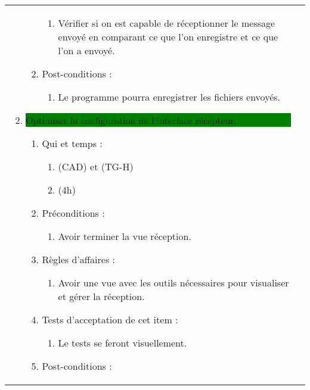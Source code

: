 \begin{longtable}{|l|p{}|}
\begin{enumerate}[label*=\arabic*.]
\begin{enumerate}[label*=\arabic*.]
\begin{enumerate}[label*=\arabic*.]
                        \item Vérifier si on est capable de réceptionner le message envoyé en comparant ce que l'on enregistre et ce que l'on a envoyé.
                    \end{enumerate}
                    \item Post-conditions :
                    \begin{enumerate}[label*=\arabic*.]
                        \item Le programme pourra enregistrer les fichiers envoyés.
                    \end{enumerate}
                \end{enumerate}
            \item \colorbox{Green}{\parbox{13cm}{Optimiser la configuration de l'interface récepteur.}}
                \begin{enumerate}[label*=\arabic*.]
                    \item Qui et temps :
                    \begin{enumerate}[label*=\arabic*.]
                        \item (CAD) et (TG-H)
                        \item (4h)
                    \end{enumerate}
                    \item Préconditions : 
                    \begin{enumerate}[label*=\arabic*.]
                        \item Avoir terminer la vue réception.
                    \end{enumerate}
                    \item Règles d’affaires :
                    \begin{enumerate}[label*=\arabic*.]
                        \item Avoir une vue avec les outils nécessaires pour visualiser et gérer la réception.
                    \end{enumerate}
                    \item Tests d'acceptation de cet item :
                    \begin{enumerate}[label*=\arabic*.]
                        \item Le tests se feront visuellement.
                    \end{enumerate}
                    \item Post-conditions :
                    \begin{enumerate}[label*=\arabic*.]

\end{enumerate}
\end{enumerate}
\end{enumerate}
\end{longtable}
